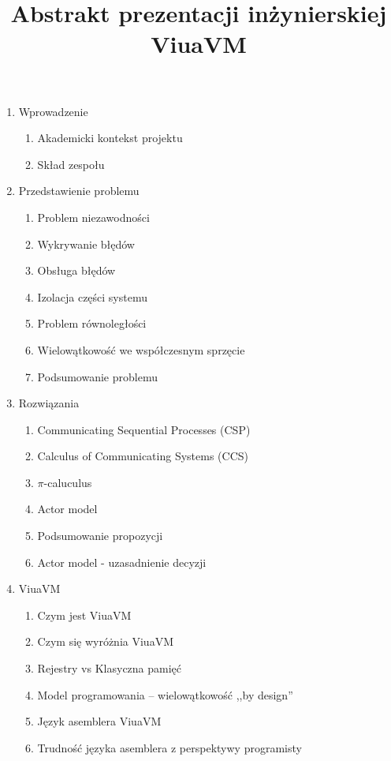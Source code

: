 \documentclass[11pt,oneside,a4paper,twocolumn]{article}
\title{Abstrakt prezentacji inżynierskiej ViuaVM}
\begin{document}
\maketitle

\begin{enumerate}
	\item Wprowadzenie
	\begin{enumerate}
		\item Akademicki kontekst projektu
		\item Skład zespołu
	\end{enumerate}
	
	\item Przedstawienie problemu
	\begin{enumerate}
		\item Problem niezawodności
		\item Wykrywanie błędów
		\item Obsługa błędów
		\item Izolacja części systemu
		\item Problem równoległości
		\item Wielowątkowość we współczesnym sprzęcie
		\item Podsumowanie problemu
	\end{enumerate}
	
	\item Rozwiązania
	\begin{enumerate}
		\item Communicating Sequential Processes (CSP)
		\item Calculus of Communicating Systems (CCS)
		\item $\pi$-caluculus
		\item Actor model
		\item Podsumowanie propozycji
		\item Actor model - uzasadnienie decyzji
	\end{enumerate}		
	
	\item ViuaVM
	\begin{enumerate}
		\item Czym jest ViuaVM
		\item Czym się wyróżnia ViuaVM
		\item Rejestry vs Klasyczna pamięć
		\item Model programowania -- wielowątkowość ,,by design''
		\item Język asemblera ViuaVM
		\item Trudność języka asemblera z perspektywy programisty
	\end{enumerate}
	

\end{enumerate}
\end{document}
